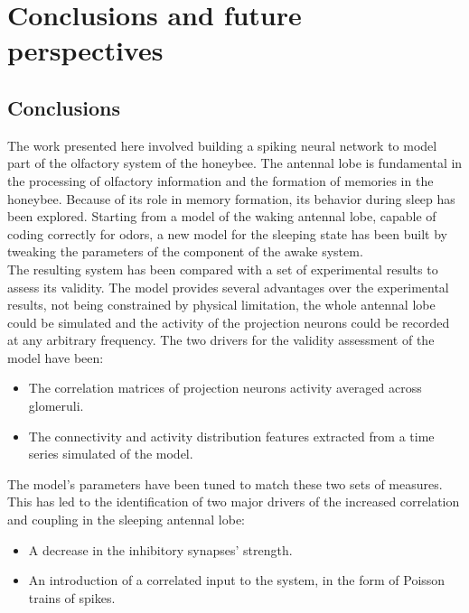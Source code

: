 \graphicspath{{chapters/07_conclusions/}}
\chapter{Conclusions and future perspectives}

\section{Conclusions}
The work presented here involved building a spiking neural network to model part of the olfactory system of the honeybee.
The antennal lobe is fundamental in the processing of olfactory information and the formation of memories in the honeybee.
Because of its role in memory formation, its behavior during sleep has been explored.
Starting from a model of the waking antennal lobe, capable of coding correctly for odors, a new model for the sleeping state has been built by tweaking the parameters of the component of the awake system.\\

The resulting system has been compared with a set of experimental results to assess its validity.
The model provides several advantages over the experimental results, not being constrained by physical limitation, the whole antennal lobe could be simulated and the activity of the projection neurons could be recorded at any arbitrary frequency.
The two drivers for the validity assessment of the model have been:

\begin{itemize}
  \item The correlation matrices of projection neurons activity averaged across glomeruli.
  \item The connectivity and activity distribution features extracted from a time series simulated of the model.
\end{itemize}

The model's parameters have been tuned to match these two sets of measures.\\

This has led to the identification of two major drivers of the increased correlation and coupling in the sleeping antennal lobe:

\begin{itemize}
  \item A decrease in the inhibitory synapses' strength.
  \item An introduction of a correlated input to the system, in the form of Poisson trains of spikes.
\end{itemize}

